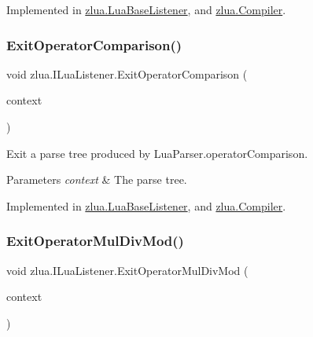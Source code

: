 Implemented in \mbox{\hyperlink{classzlua_1_1_lua_base_listener_ac5e1c31e302e8eeae5a2bb9c585b40a2}{zlua.\+Lua\+Base\+Listener}}, and \mbox{\hyperlink{classzlua_1_1_compiler_ac96911516696a03a45807348f6338b41}{zlua.\+Compiler}}.

\mbox{\label{interfacezlua_1_1_i_lua_listener_a0c4de7c4814a744326fcf623c7ffc05c}} 
\subsubsection{\texorpdfstring{Exit\+Operator\+Comparison()}{ExitOperatorComparison()}}
{\footnotesize\ttfamily void zlua.\+I\+Lua\+Listener.\+Exit\+Operator\+Comparison (\begin{DoxyParamCaption}\item[{\mbox{[}\+Not\+Null\mbox{]} \mbox{\hyperlink{classzlua_1_1_lua_parser_1_1_operator_comparison_context}{Lua\+Parser.\+Operator\+Comparison\+Context}}}]{context }\end{DoxyParamCaption})}



Exit a parse tree produced by Lua\+Parser.\+operator\+Comparison. 


\begin{DoxyParams}{Parameters}
{\em context} & The parse tree.\\
\hline
\end{DoxyParams}


Implemented in \mbox{\hyperlink{classzlua_1_1_lua_base_listener_a650d952f0fddbd4ddb499a7074528e60}{zlua.\+Lua\+Base\+Listener}}, and \mbox{\hyperlink{classzlua_1_1_compiler_af08a21dc48be4131cee4560b260d09c2}{zlua.\+Compiler}}.

\mbox{\label{interfacezlua_1_1_i_lua_listener_a67436f1864c243aabc07a339c1c96085}} 
\subsubsection{\texorpdfstring{Exit\+Operator\+Mul\+Div\+Mod()}{ExitOperatorMulDivMod()}}
{\footnotesize\ttfamily void zlua.\+I\+Lua\+Listener.\+Exit\+Operator\+Mul\+Div\+Mod (\begin{DoxyParamCaption}\item[{\mbox{[}\+Not\+Null\mbox{]} \mbox{\hyperlink{classzlua_1_1_lua_parser_1_1_operator_mul_div_mod_context}{Lua\+Parser.\+Operator\+Mul\+Div\+Mod\+Context}}}]{context }\end{DoxyParamCaption})}



